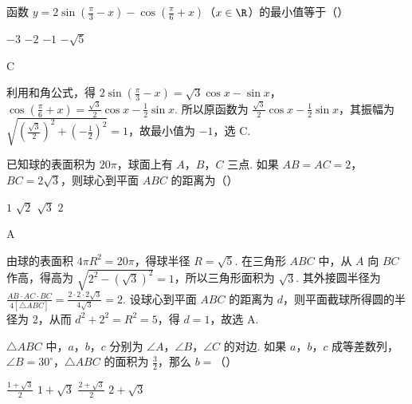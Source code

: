 \begin{problem}
函数 \(y = 2\sin \left(\frac{\pi}{3} - x\right) - \cos \left(\frac{\pi}{6} + x\right)\)（\(x \in \R\)）的最小值等于（\quad）

\choices
    {\(-3\)}
    {\(-2\)}
    {\(-1\)}
    {\(-\sqrt{5}\)}
\end{problem}

\begin{answer}
C
\end{answer}

\begin{solution}
利用和角公式，得 \(2\sin\left(\frac{\pi}{3}-x\right)=\sqrt{3}\cos x-\sin x\)，\(\cos\left(\frac{\pi}{6}+x\right)=\frac{\sqrt{3}}{2}\cos x-\frac{1}{2}\sin x\). 所以原函数为 \(\frac{\sqrt{3}}{2}\cos x-\frac{1}{2}\sin x\)，其振幅为 \(\sqrt{\left(\frac{\sqrt{3}}{2}\right)^2+\left(-\frac{1}{2}\right)^2}=1\)，故最小值为 \(-1\)，选 C.
\end{solution}

\begin{problem}
已知球的表面积为 \(20\pi\)，球面上有 \(A\)，\(B\)，\(C\) 三点. 如果 \(AB = AC = 2\)，\(BC = 2\sqrt{3}\)，则球心到平面 \(ABC\) 的距离为（\quad）

\choices
    {\(1\)}
    {\(\sqrt{2}\)}
    {\(\sqrt{3}\)}
    {\(2\)}
\end{problem}

\begin{answer}
A
\end{answer}

\begin{solution}
由球的表面积 \(4\pi R^2=20\pi\)，得球半径 \(R=\sqrt{5}\). 在三角形 \(ABC\) 中，从 \(A\) 向 \(BC\) 作高，得高为 \(\sqrt{2^2-(\sqrt{3})^2}=1\)，所以三角形面积为 \(\sqrt{3}\). 其外接圆半径为 \(\frac{AB\cdot AC\cdot BC}{4[\triangle ABC]}=\frac{2\cdot2\cdot2\sqrt{3}}{4\sqrt{3}}=2\). 设球心到平面 \(ABC\) 的距离为 \(d\)，则平面截球所得圆的半径为 \(2\)，从而 \(d^2+2^2=R^2=5\)，得 \(d=1\)，故选 A.
\end{solution}

\begin{problem}
\(\triangle ABC\) 中，\(a\)，\(b\)，\(c\) 分别为 \(\angle A\)，\(\angle B\)，\(\angle C\) 的对边. 如果 \(a\)，\(b\)，\(c\) 成等差数列，\(\angle B = 30^{\circ}\)，\(\triangle ABC\) 的面积为 \(\frac{3}{2}\)，那么 \(b =\)（\quad）

\choices
    {\(\frac{1 + \sqrt{3}}{2}\)}
    {\(1 + \sqrt{3}\)}
    {\(\frac{2 + \sqrt{3}}{2}\)}
    {\(2 + \sqrt{3}\)}
\end{problem}


